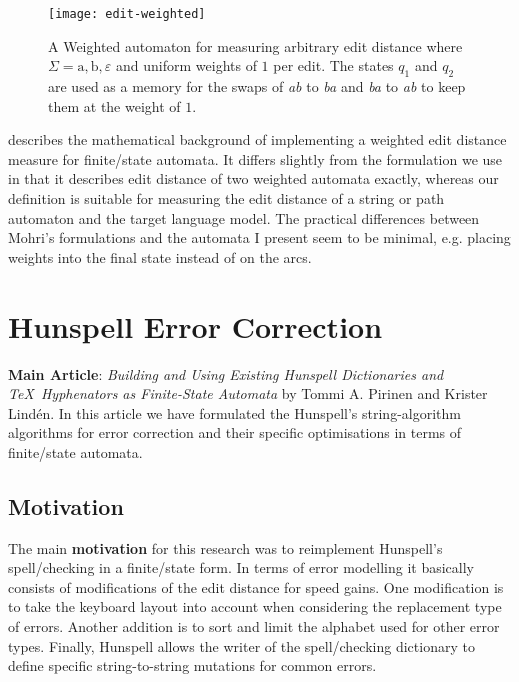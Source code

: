 \documentclass[officiallayout,final]{unihelcompling}
\begin{document}
\begin{figure}
    \texttt{[image: edit-weighted]}
    \caption{A Weighted automaton for measuring arbitrary edit distance where
        $\Sigma = {\mathrm{a}, \mathrm{b}, \varepsilon}$ and uniform weights of $1$ per
        edit. The states $q_1$ and $q_2$ are used as a memory for
        the swaps of \emph{ab} to \emph{ba} and \emph{ba} to \emph{ab} to
        keep them at the weight of $1$. \label{fig:edit-weighted}}
\end{figure}

\citet{mohri2003edit} describes the mathematical background of implementing a
weighted edit distance measure for finite\-/state automata. It differs slightly
from the formulation we use in that it describes edit distance of two weighted
automata exactly, whereas our definition is suitable for measuring the edit
distance of a string or path automaton and the target language model. The
practical differences between Mohri's formulations and the automata I present
seem to be minimal, e.g. placing weights into the final state instead
of on the arcs.

\section{Hunspell Error Correction}
\label{sec:Hunspell-error}

\textbf{Main Article}: \emph{Building and Using Existing Hunspell Dictionaries
and \TeX\ Hyphenators as Finite-State Automata} by Tommi A. Pirinen and Krister
Lindén.  In this article we have formulated the Hunspell's string-algorithm
algorithms for error correction and their specific optimisations in terms
of finite\-/state automata.

\subsection{Motivation}

The main \textbf{motivation} for this research was to reimplement Hunspell's
spell\-/checking in a finite\-/state form. In terms of error modelling it
basically consists of modifications of the edit distance for speed gains.  One
modification is to take the keyboard layout into account when considering the
replacement type of errors. Another addition is to sort and limit the alphabet
used for other error types. Finally, Hunspell allows the writer of the
spell\-/checking dictionary to define specific string-to-string mutations for
common errors.
\end{document}
